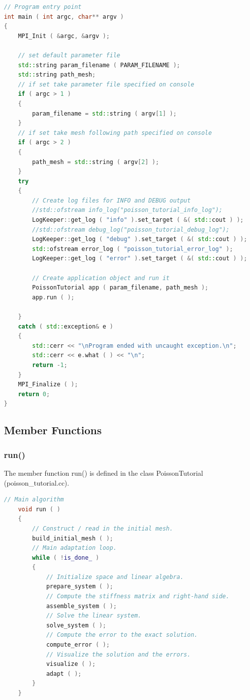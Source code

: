 \documentclass[a4paper, 11pt, twoside]{article}
\begin{document}
\begin{lstlisting}[language=C++, basicstyle={\footnotesize, \ttfamily}, keywordstyle=\color{blue}, numbers=none, tabsize=4]
// Program entry point
int main ( int argc, char** argv )
{
    MPI_Init ( &argc, &argv );

    // set default parameter file
    std::string param_filename ( PARAM_FILENAME );
    std::string path_mesh;
    // if set take parameter file specified on console
    if ( argc > 1 )
    {
        param_filename = std::string ( argv[1] );
    }
    // if set take mesh following path specified on console
    if ( argc > 2 )
    {
        path_mesh = std::string ( argv[2] );
    }
    try
    {
        // Create log files for INFO and DEBUG output
        //std::ofstream info_log("poisson_tutorial_info_log");
        LogKeeper::get_log ( "info" ).set_target ( &( std::cout ) );
        //std::ofstream debug_log("poisson_tutorial_debug_log");
        LogKeeper::get_log ( "debug" ).set_target ( &( std::cout ) );
        std::ofstream error_log ( "poisson_tutorial_error_log" );
        LogKeeper::get_log ( "error" ).set_target ( &( std::cout ) );

        // Create application object and run it
        PoissonTutorial app ( param_filename, path_mesh );
        app.run ( );

    }
    catch ( std::exception& e )
    {
        std::cerr << "\nProgram ended with uncaught exception.\n";
        std::cerr << e.what ( ) << "\n";
        return -1;
    }
    MPI_Finalize ( );
    return 0;
}
\end{lstlisting}

\subsection{Member Functions}
\subsubsection{run()}
The member function run() is defined in the class PoissonTutorial (poisson\_tutorial.cc).

\begin{lstlisting}[language=C++, basicstyle={\footnotesize, \ttfamily}, keywordstyle=\color{blue}, numbers=none, tabsize=4]
// Main algorithm
    void run ( )
    {
        // Construct / read in the initial mesh.
        build_initial_mesh ( );
        // Main adaptation loop.
        while ( !is_done_ )
        {
            // Initialize space and linear algebra.
            prepare_system ( );
            // Compute the stiffness matrix and right-hand side.
            assemble_system ( );
            // Solve the linear system.
            solve_system ( );
            // Compute the error to the exact solution.
            compute_error ( );
            // Visualize the solution and the errors.
            visualize ( );
            adapt ( );
        }
    }
\end{lstlisting}
\newpage
\end{document}
